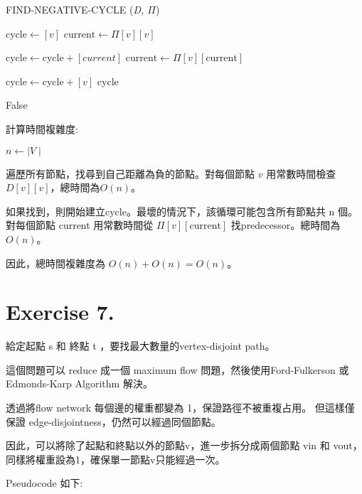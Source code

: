 \documentclass[UTF8, a4paper, 11pt]{report}
\begin{document}
\begin{algorithm}
    \caption{FIND-NEGATIVE-CYCLE (\textit{D, $\Pi$})}
    \begin{algorithmic}[1]
         
        \State $\text{cycle} \gets [v]$
        \State $\text{current} \gets \Pi[v][v]$

        \State $\text{cycle} \gets \text{cycle} + [current]$
        \State $\text{current} \gets \Pi[v][\text{current}]$
        \EndWhile

        \State $\text{cycle} \gets \text{cycle} + [v]$ 
        \State \Return cycle
        \EndIf
        \EndFor

        \State \Return False 
    \end{algorithmic}
\end{algorithm}

計算時間複雜度:

$n \gets \mid V\mid$

遍歷所有節點，找尋到自己距離為負的節點。對每個節點 $v$ 用常數時間檢查 $D[v][v]$，總時間為$O(n)$。

如果找到，則開始建立cycle。最壞的情況下，該循環可能包含所有節點共 n 個。對每個節點 current 用常數時間從 $\Pi[v][\text{current}]$ 找predecessor。總時間為 $O(n)$。

因此，總時間複雜度為 $O(n) + O(n) = O(n)$。

\pagebreak

\section*{Exercise 7.}

給定起點 s 和 終點 t ，要找最大數量的vertex-disjoint path。

這個問題可以 reduce 成一個 maximum flow 問題，然後使用Ford-Fulkerson 或 Edmonds-Karp Algorithm 解決。

透過將flow network 每個邊的權重都變為 1，保證路徑不被重複占用。 但這樣僅保證 edge-disjointness，仍然可以經過同個節點。

因此，可以將除了起點和終點以外的節點v，進一步拆分成兩個節點 vin 和 vout，同樣將權重設為1，確保單一節點v只能經過一次。

Pseudocode 如下:
\end{document}
